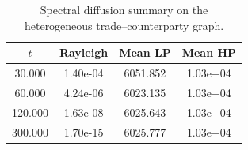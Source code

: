 \begin{table}[t]
\centering
\small
\setlength{\tabcolsep}{5pt}
\begin{tabular}{cccc}
\toprule
$t$ & Rayleigh & Mean LP & Mean HP \\
\midrule
30.000 & 1.40e-04 & 6051.852 & 1.03e+04 \\
60.000 & 4.24e-06 & 6023.135 & 1.03e+04 \\
120.000 & 1.63e-08 & 6025.643 & 1.03e+04 \\
300.000 & 1.70e-15 & 6025.777 & 1.03e+04 \\
\bottomrule
\end{tabular}
\caption{Spectral diffusion summary on the heterogeneous trade--counterparty graph.}
\label{tab:hetero_diffusion_summary}
\end{table}